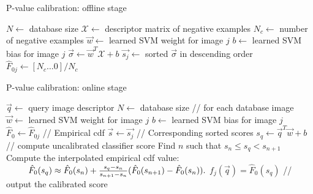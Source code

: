  
 
      \begin{algorithm}
         \caption{P-value calibration: offline stage}\label{alg:offline}
         \begin{algorithmic}[1]
         \State $N \gets$ database size
         \State $\mathcal{X} \gets$ descriptor matrix of negative examples %
            \State $N_c \gets$ number of negative examples
            \State $\vec{w} \gets$ learned SVM weight for image $j$
            \State $b \gets$ learned SVM bias for image $j$
            \State $\vec{\sigma} \gets \vec{w}^T \mathcal{X}+b$
            \State $\vec{s_j} \gets$ sorted $\vec{\sigma}$ in descending order
            \State $\hat{F}_{0j} \gets [N_c \dots 0]/N_c$
         \EndFor
         \EndProcedure
         \end{algorithmic}
         \label{alg:onffline}
      \end{algorithm}

       \begin{algorithm}
         \caption{P-value calibration: online stage}\label{alg:online}
         \begin{algorithmic}[1]
         \State $\vec{q} \gets$ query image descriptor
         \State $N \gets$ database size
          // for each database image
            \State $\vec{w} \gets$ learned SVM weight for image $j$
            \State $b \gets$ learned SVM bias for image $j$
            \State $\hat{F}_{0} \gets \hat{F}_{0j}$ // Empirical cdf
            \State $\vec{s} \gets \vec{s_j}$ // Corresponding sorted scores
            \State $s_q \gets \vec{q}^T\vec{w}+b$  // compute uncalibrated classifier score 
            \State Find $n$ such that $s_{n} \leq s_q < s_{n+1} $
            \State Compute the interpolated empirical cdf value:
            \Statex $\hspace{9mm}
              \hat{F}_0(s_q)\approx 
              \hat{F}_0(s_n)+\frac{s_q-s_n}{s_{n+1}-s_n} (\hat{F}_0(s_{n+1})-\hat{F}_0(s_n)).
            $
            \State $f_j(\vec{q})=\hat{F}_0(s_q)$ // output the calibrated score
         
         \EndFor
         \EndProcedure
         \end{algorithmic}
         \label{alg:online}
      \end{algorithm}
      
